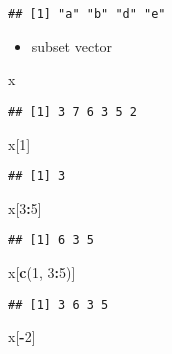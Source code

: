\documentclass[
  a4paper,
]{article}
\newenvironment{Shaded}{\begin{snugshade}}{\end{snugshade}}
\newcommand{\DecValTok}[1]{\textcolor[rgb]{0.00,0.00,0.81}{#1}}
\newcommand{\FunctionTok}[1]{\textcolor[rgb]{0.13,0.29,0.53}{\textbf{#1}}}
\newcommand{\NormalTok}[1]{#1}
\newcommand{\SpecialCharTok}[1]{\textcolor[rgb]{0.81,0.36,0.00}{\textbf{#1}}}
\providecommand{\tightlist}{%
  \setlength{\itemsep}{0pt}\setlength{\parskip}{0pt}}
\begin{document}
\begin{verbatim}
## [1] "a" "b" "d" "e"
\end{verbatim}

\begin{itemize}
\tightlist
\item
  subset vector
\end{itemize}

\begin{Shaded}
\begin{Highlighting}[]
\NormalTok{x}
\end{Highlighting}
\end{Shaded}

\begin{verbatim}
## [1] 3 7 6 3 5 2
\end{verbatim}

\begin{Shaded}
\begin{Highlighting}[]
\NormalTok{x[}\DecValTok{1}\NormalTok{]}
\end{Highlighting}
\end{Shaded}

\begin{verbatim}
## [1] 3
\end{verbatim}

\begin{Shaded}
\begin{Highlighting}[]
\NormalTok{x[}\DecValTok{3}\SpecialCharTok{:}\DecValTok{5}\NormalTok{]}
\end{Highlighting}
\end{Shaded}

\begin{verbatim}
## [1] 6 3 5
\end{verbatim}

\begin{Shaded}
\begin{Highlighting}[]
\NormalTok{x[}\FunctionTok{c}\NormalTok{(}\DecValTok{1}\NormalTok{, }\DecValTok{3}\SpecialCharTok{:}\DecValTok{5}\NormalTok{)]}
\end{Highlighting}
\end{Shaded}

\begin{verbatim}
## [1] 3 6 3 5
\end{verbatim}

\begin{Shaded}
\begin{Highlighting}[]
\NormalTok{x[}\SpecialCharTok{{-}}\DecValTok{2}\NormalTok{]}
\end{Highlighting}
\end{Shaded}
\end{document}
